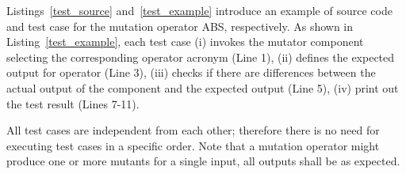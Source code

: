 Listings~\ref{test_source} and~\ref{test_example} introduce an example of source code and test case for the mutation operator ABS, respectively. As shown in Listing~\ref{test_example}, each test case (i) invokes the mutator component selecting the corresponding operator acronym (Line 1), (ii) defines the expected output for operator (Line 3), (iii) checks if there are differences between the actual output of the component and the expected output (Line 5), (iv) print out the test result (Lines 7-11).

All test cases are independent from each other; therefore there is no need for executing test cases in a specific order.
Note that a mutation operator might produce one or more mutants for a single input, all outputs shall be as expected.



